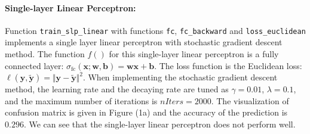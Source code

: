\documentclass[11pt]{scrartcl}
\begin{document}
\paragraph{\textbf{Single-layer Linear Perceptron:}}
Function \texttt{train\_slp\_linear} with functions  \texttt{fc}, \texttt{fc\_backward} and \texttt{loss\_euclidean} implements a single layer linear perceptron with stochastic gradient descent method. The function $f()$ for this single-layer linear perceptron is a fully connected layer: $\sigma_{\text{fc}}(\mathbf{x};\mathbf{w},\mathbf{b})=\mathbf{wx}+\mathbf{b}$. The loss function is the Euclidean loss: $\ell(\mathbf{y},\tilde{\mathbf{y}})=\Vert\mathbf{y}-\tilde{\mathbf{y}}\Vert^2$. When implementing the stochastic gradient descent method, the learning rate and the decaying rate are tuned as $\gamma=0.01$, $\lambda=0.1$, and the maximum number of iterations is $\textit{nIters}=2000$.  The visualization of confusion matrix is given in Figure (1a) and the accuracy of the prediction is  $0.296$. We can see that the single-layer linear perceptron does not perform well.


\begin{figure}[H]
	\captionsetup[subfigure]{labelformat=empty}
	\centering
	\label{fig:slp_linear}
\end{figure}
\end{document}

